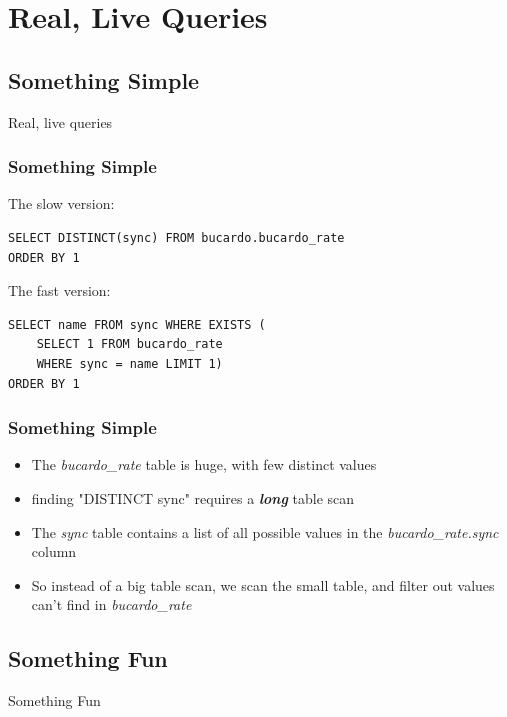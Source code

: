 \documentclass{beamer}
\begin{document}
\section{Real, Live Queries}
\subsection{Something Simple}
\begin{frame}
    \begin{center}
       Real, live queries
    \end{center}
\end{frame}

\begin{frame}[fragile]
    \frametitle{Something Simple}
    The slow version:
    \begin{verbatim}
SELECT DISTINCT(sync) FROM bucardo.bucardo_rate
ORDER BY 1
    \end{verbatim}
    The fast version:
    \begin{verbatim}
SELECT name FROM sync WHERE EXISTS (
    SELECT 1 FROM bucardo_rate
    WHERE sync = name LIMIT 1)
ORDER BY 1
    \end{verbatim}
\end{frame}

\begin{frame}
    \frametitle{Something Simple}
    \begin{itemize}
        \item The \emph{bucardo\_rate} table is huge, with few distinct values
        \pause
        \item finding "DISTINCT sync" requires a \textbf{\emph{long}} table scan
        \pause
        \item The \emph{sync} table contains a list of all possible values in the \emph{bucardo\_rate.sync} column
        \pause
        \item So instead of a big table scan, we scan the small table, and filter out values can't find in \emph{bucardo\_rate}
    \end{itemize}
\end{frame}

\subsection{Something Fun}
\begin{frame}
    \begin{center}Something Fun\end{center}
\end{frame}
\end{document}
